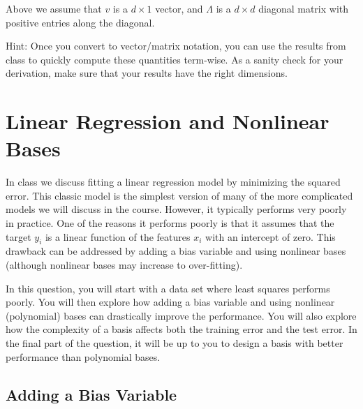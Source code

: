 \documentclass{article}
\begin{document}
Above we assume that $v$ is a $d \times 1$ vector, and $\Lambda$ is a $d \times d$ diagonal matrix with positive entries along the diagonal.

Hint: Once you convert to vector/matrix notation, you can use the results from class to quickly compute these quantities term-wise. 
As a sanity check for your derivation, make sure that your results have the right dimensions.


\section{Linear Regression and Nonlinear Bases}

In class we discuss fitting a linear regression model by minimizing the squared error. 
This classic model is the simplest version of many of the more complicated models we will discuss in the course. 
However, it typically performs very poorly in practice. 
One of the reasons it performs poorly is that it assumes that the target $y_i$ is a linear function of 
the features $x_i$ with an intercept of zero. This drawback can be addressed by adding a bias variable
 and using nonlinear bases (although nonlinear bases may increase to over-fitting). 

In this question, you will start with a data set where least squares performs poorly. 
You will then explore how adding a bias variable and using nonlinear (polynomial) bases can drastically improve the performance. 
You will also explore how the complexity of a basis affects both the training error and the test error. 
In the final part of the question, it will be up to you to design a basis with better performance than polynomial bases. 

\subsection{Adding a Bias Variable}
\end{document}
